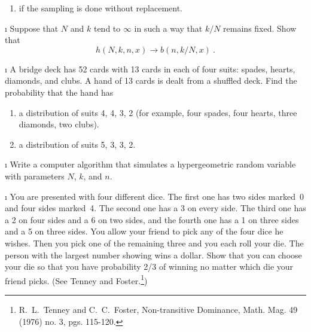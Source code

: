 \begin{LJSItem}
\begin{enumerate}
\item if the sampling is done without replacement.
\end{enumerate}

\i\label{exer 5.1.28} Suppose that $N$ and $k$ tend to $\infty$ in such a way that
$k/N$ remains fixed.  Show that
$$h(N, k, n, x) \rightarrow b(n, k/N, x)\ .$$

\i\label{exer 5.1.24} A bridge deck has 52 cards with 13 cards in each of four
suits: spades, hearts, diamonds, and clubs.  A hand of 13 cards is dealt from a
shuffled deck.  Find the probability that the hand has
\begin{enumerate}

\item a distribution of suits 4, 4, 3, 2 (for example, four spades, four hearts, three
diamonds, two clubs).

\item a distribution of suits 5, 3, 3, 2.
\end{enumerate}

\i\label{exer 5.1.125} Write a computer algorithm that simulates a hypergeometric random variable with
parameters $N$,  $k$, and $n$.

\i\label{exer 7.1.9} You are presented with four different dice.  The first one has
two sides marked~0 and four sides marked~4.  The second one has a 3 on every side. 
The third one has a 2 on four sides and a 6 on two sides, and the fourth one has a 1
on three sides and a 5 on three sides.  You allow your friend to pick any of the four
dice he wishes.  Then you pick one of the remaining three and you each roll your die. 
The person with the largest number showing wins a dollar.  Show that you can choose
your die so that you have probability 2/3 of winning no matter which die your friend
picks.  (See Tenney and Foster.\footnote{R.~L.~Tenney and C.~C.~Foster,  \emx 
{Non-transitive Dominance}, Math. Mag. 49 (1976) no. 3, pgs. 115-120.})


\end{LJSItem}
